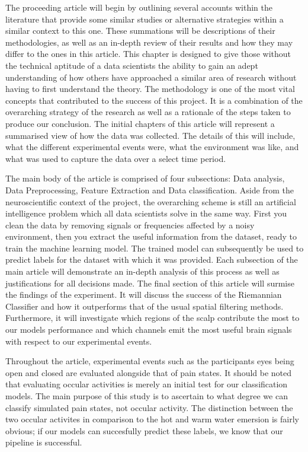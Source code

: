 \documentclass[11pt]{article}
\begin{document}
The proceeding article will begin by outlining several accounts within the literature that provide some similar studies or alternative strategies within a similar context to this one. These summations will be descriptions of their methodologies, as well as an in-depth review of their results and how they may differ to the ones in this article. This chapter is designed to give those without the technical aptitude of a data scientists the ability to gain an adept understanding of  how others have approached a similar area of research without having to first understand the theory. The methodology is one of the most vital concepts that contributed to the success of this project. It is a combination of the overarching strategy of the research as well as a rationale of the steps taken to produce our conclusion. The initial chapters of this article will represent a summarised view of how the data was collected. The details of this will include, what the different experimental events were, what the environment was like, and what was used to capture the data over a select time period. 

The main body of the article is comprised of four subsections: Data analysis, Data Preprocessing, Feature Extraction and Data classification. Aside from the neuroscientific context of the project, the overarching scheme is still an artificial intelligence problem which all data scientists solve in the same way. First you clean the data by removing signals or frequencies affected by a noisy environment, then you extract the useful information from the dataset, ready to train the machine learning model. The trained model can subsequently be used to predict labels for the dataset with which it was provided. Each subsection of the main article will demonstrate an in-depth analysis of this process as well as justifications for all decisions made. The final section of this article will surmise the findings of the experiment. It will discuss the success of the Riemannian Classifier and how it outperforms that of the usual spatial filtering methods. Furthermore, it will investigate which regions of the scalp contribute the most to our models performance and which channels emit the most useful brain signals with respect to our experimental events.
 
Throughout the article, experimental events such as the participants eyes being open and closed are evaluated alongside that of pain states. It should be noted that evaluating occular activities is merely an initial test for our classification models. The main purpose of this study is to ascertain to what degree we can classify simulated pain states, not occular activity. The distinction between the two occular activites in comparison to the hot and warm water emersion is fairly obvious; if our models can succesfully predict these labels, we know that our pipeline is successful. 
\end{document}
